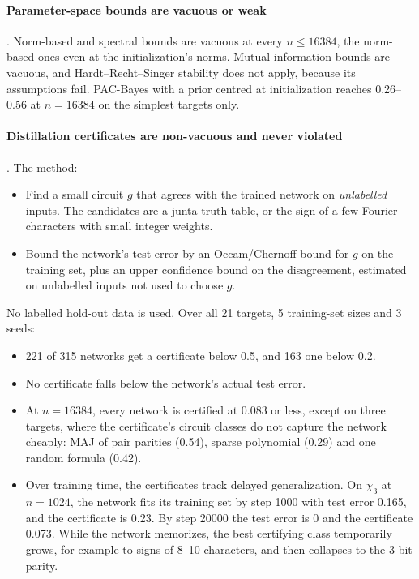 \paragraph{Parameter-space bounds are vacuous or weak} . Norm-based and spectral bounds are vacuous at every $n\le16384$, the norm-based ones even at the initialization's norms. Mutual-information bounds are vacuous, and Hardt–Recht–Singer stability does not apply, because its assumptions fail. PAC-Bayes with a prior centred at initialization \cite{mcallester1999pacbayes,dziugaite2017computing} reaches 0.26–0.56 at $n=16384$ on the simplest targets only.

\paragraph{Distillation certificates are non-vacuous and never violated} . The method:
\begin{itemize}
\item Find a small circuit $g$ that agrees with the trained network on \emph{unlabelled} inputs. The candidates are a junta truth table, or the sign of a few Fourier characters with small integer weights.
\item Bound the network's test error by an Occam/Chernoff bound for $g$ on the training set, plus an upper confidence bound on the disagreement, estimated on unlabelled inputs not used to choose $g$.
\end{itemize}
No labelled hold-out data is used. Over all 21 targets, 5 training-set sizes and 3 seeds:
\begin{itemize}
\item 221 of 315 networks get a certificate below 0.5, and 163 one below 0.2.
\item No certificate falls below the network's actual test error.
\item At $n=16384$, every network is certified at 0.083 or less, except on three targets, where the certificate's circuit classes do not capture the network cheaply: MAJ of pair parities (0.54), sparse polynomial (0.29) and one random formula (0.42).
\item Over training time, the certificates track delayed generalization. On $\chi_3$ at $n=1024$, the network fits its training set by step 1000 with test error 0.165, and the certificate is 0.23. By step 20000 the test error is 0 and the certificate 0.073. While the network memorizes, the best certifying class temporarily grows, for example to signs of 8–10 characters, and then collapses to the 3-bit parity.
\end{itemize}

